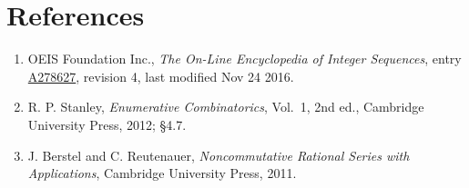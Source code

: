 \documentclass[11pt]{article}
\theoremstyle{definition}
\begin{document}
\section{References}

\begin{enumerate}

\item OEIS Foundation Inc., \emph{The On-Line Encyclopedia of Integer Sequences}, entry \href{https://oeis.org/A278627}{A278627}, revision 4, last modified Nov 24 2016.

\item R. P. Stanley, \emph{Enumerative Combinatorics}, Vol.~1, 2nd ed., Cambridge University Press, 2012; \S4.7.

\item J. Berstel and C. Reutenauer, \emph{Noncommutative Rational Series with Applications}, Cambridge University Press, 2011.

\end{enumerate}
\end{document}
